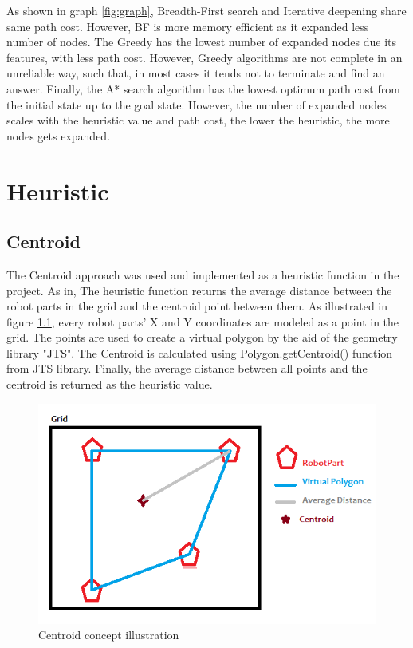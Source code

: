 As shown in graph \ref{fig:graph}, Breadth-First search and Iterative deepening share same path cost. However, BF is more memory efficient as it expanded less number of nodes. The Greedy has the lowest number of expanded nodes due its features, with less path cost. However, Greedy algorithms are not complete in an unreliable way, such that, in most cases it tends not to terminate and find an answer. Finally, the A* search algorithm has the lowest optimum path cost from the initial state up to the goal state. However, the number of expanded nodes scales with the heuristic value and path cost, the lower the heuristic, the more nodes gets expanded.



\chapter{Heuristic}
\section{Centroid}

The Centroid approach was used and implemented as a heuristic function in the project. As in, The heuristic function returns the average distance between the robot parts in the grid and the centroid point between them. As illustrated in figure \ref{fig:centroid_model}, every robot parts' X and Y coordinates are modeled as a point in the grid. The points are used to create a virtual polygon by the aid of the geometry library "JTS". The Centroid is calculated using Polygon.getCentroid() function from JTS library. Finally, the average distance between all points and the centroid is returned as the heuristic value.

\begin{figure}[H] 
   	\centering
	\includegraphics[scale=0.6]{images/Centroid} 
    \caption{Centroid concept illustration}
    \label{fig:centroid_model} 
\end{figure}


